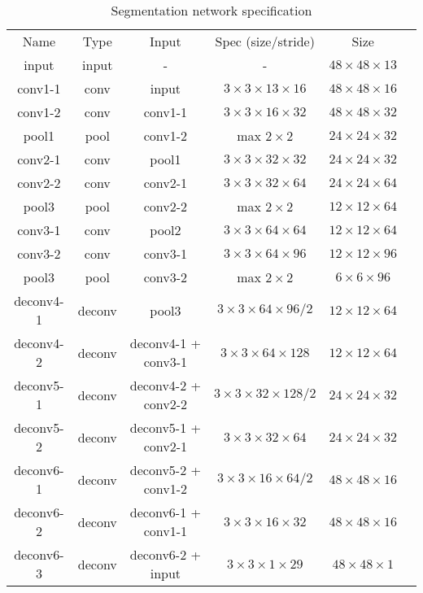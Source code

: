 \begin{table}[h!]
\caption{Segmentation network specification}
\label{tab:seg_net_spec}
\centering

\begin{small}
\begin{tabular}{cccccc}
Name       & Type   & Input                & Spec (size/stride)             & Size                 \\
input      & input  & -                    & -                              & $48\times48\times13$ \\
conv1-1    & conv   & input                & $3\times3\times13\times16$     & $48\times48\times16$ \\
conv1-2    & conv   & conv1-1              & $3\times3\times16\times32$     & $48\times48\times32$ \\
pool1      & pool   & conv1-2              & max $2\times2$                 & $24\times24\times32$ \\
conv2-1    & conv   & pool1                & $3\times3\times32\times32$     & $24\times24\times32$ \\
conv2-2    & conv   & conv2-1              & $3\times3\times32\times64$     & $24\times24\times64$ \\
pool3      & pool   & conv2-2              & max $2\times2$                 & $12\times12\times64$ \\
conv3-1    & conv   & pool2                & $3\times3\times64\times64$     & $12\times12\times64$ \\
conv3-2    & conv   & conv3-1              & $3\times3\times64\times96$     & $12\times12\times96$ \\
pool3      & pool   & conv3-2              & max $2\times2$                 & $6\times6\times96$   \\
deconv4-1  & deconv & pool3                & $3\times3\times64\times96/2$   & $12\times12\times64$ \\
deconv4-2  & deconv & deconv4-1 + conv3-1  & $3\times3\times64\times128$    & $12\times12\times64$ \\
deconv5-1  & deconv & deconv4-2 + conv2-2  & $3\times3\times32\times128/2$  & $24\times24\times32$ \\
deconv5-2  & deconv & deconv5-1 + conv2-1  & $3\times3\times32\times64$     & $24\times24\times32$ \\
deconv6-1  & deconv & deconv5-2 + conv1-2  & $3\times3\times16\times64/2$   & $48\times48\times16$ \\
deconv6-2  & deconv & deconv6-1 + conv1-1  & $3\times3\times16\times32$     & $48\times48\times16$ \\
deconv6-3  & deconv & deconv6-2 + input    & $3\times3\times1\times29$      & $48\times48\times1$  \\

\end{tabular}
\end{small}
\end{table}
